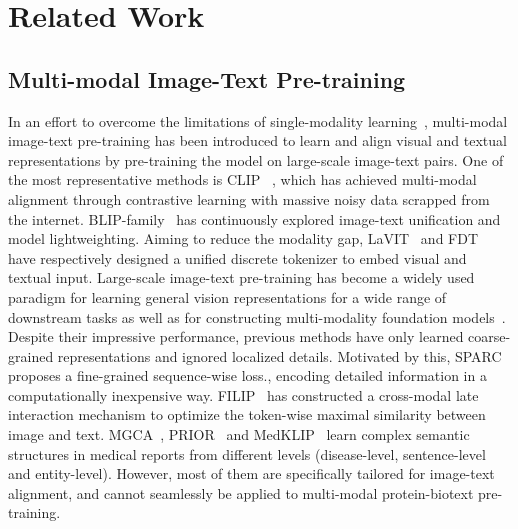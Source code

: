\section{Related Work}
\subsection{Multi-modal Image-Text Pre-training}
In an effort to overcome the limitations of single-modality learning~\cite{groupon}, multi-modal image-text pre-training has been introduced to learn and align visual and textual representations by pre-training the model on large-scale image-text pairs. 
One of the most representative methods is CLIP~\cite{clip} , which has achieved multi-modal alignment through contrastive learning with massive noisy data scrapped from the internet. BLIP-family~\cite{BLIP, BLIP2} has continuously explored image-text unification and model lightweighting. Aiming to reduce the modality gap, LaVIT~\cite{LaVIT} and FDT~\cite{FDT} have respectively designed a unified discrete tokenizer to embed visual and textual input.
Large-scale image-text pre-training has become a widely used paradigm for learning general vision representations for a wide range of downstream tasks as well as for constructing multi-modality foundation models~\cite{LLaVA, LLaVA-Med}. 
Despite their impressive performance, previous methods have only learned coarse-grained representations and ignored localized details.
Motivated by this, SPARC~\cite{SPARC} proposes a fine-grained sequence-wise loss., encoding detailed information in a computationally inexpensive way. 
FILIP~\cite{filip} has constructed a cross-modal late interaction mechanism to optimize the token-wise maximal similarity between image and text. 
MGCA~\cite{MGCA}, PRIOR~\cite{PRIOR} and MedKLIP~\cite{MedKLIP} learn complex semantic structures in medical reports from different levels (disease-level, sentence-level and entity-level).
However, most of them are specifically tailored for image-text alignment, and cannot seamlessly be applied to multi-modal protein-biotext pre-training.

